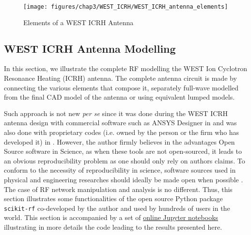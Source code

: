 {\begin{figure}
	\centering
	\texttt{[image: figures/chap3/WEST\_ICRH/WEST\_ICRH\_antenna\_elements]}
	\caption{Elements of a WEST ICRH Antenna}
	\label{fig:westicrhantennaelements}
\end{figure}

\clearpage

\subsection{WEST ICRH Antenna Modelling}\label{sec:WEST_ICRH_antenna_modelling}
In this section, we illustrate the complete RF modelling the WEST Ion Cyclotron Resonance Heating (ICRH) antenna. The complete antenna circuit is made by connecting the various elements that compose it, separately full-wave modelled from the final CAD model of the antenna or using equivalent lumped models. 

Such approach is not new \textit{per se} since it was done during the WEST ICRH antenna design with commercial software such as ANSYS Designer in  and was also done with proprietary codes (i.e. owned by the person or the firm who has developed it) in . However, the author firmly believes in the advantages Open Source software in Science, as when these tools are not open-sourced, it leads to an obvious reproducibility problem as one should only rely on authors claims. To conform to the necessity of reproducibility in science,  software sources used in physical and engineering researches should ideally be made open when possible . The case of RF network manipulation and analysis is no different. Thus, this section illustrates some functionalities of the open source Python package \texttt{scikit-rf} co-developed by the author and used by hundreds of users in the world. This section is accompanied by a set of  \href{https://doi.org/10.5281/zenodo.2668370}{online Jupyter notebooks} illustrating in more details the code leading to the results presented here.




}
